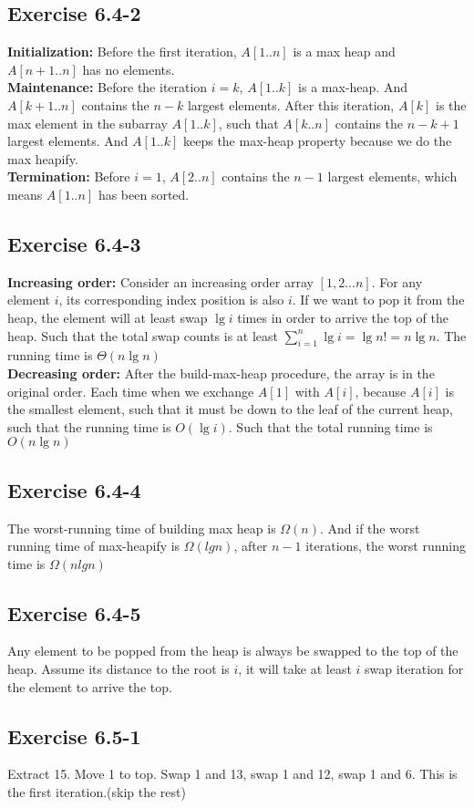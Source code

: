 \documentclass[12pt]{article}
\theoremstyle{definition}
\theoremstyle{remark}
\begin{document}
\subsection*{Exercise 6.4-2}
\textbf{Initialization:} Before the first iteration, $A[1..n]$ is a max heap and $A[n+1..n]$ has no elements.\\
\textbf{Maintenance:} Before the iteration $i=k$, $A[1..k]$ is a max-heap. And $A[k+1..n]$ contains the $n-k$ largest elements. After this iteration, $A[k]$ is the max element in the subarray $A[1..k]$, such that $A[k..n]$ contains the $n-k+1$ largest elements. And $A[1..k]$ keeps the max-heap property because we do the max heapify.\\
\textbf{Termination:} Before $i=1$, $A[2..n]$ contains the $n-1$ largest elements, which means $A[1..n]$ has been sorted.
\subsection*{Exercise 6.4-3}
\textbf{Increasing order:} Consider an increasing order array $[1,2...n]$. For any element $i$, its corresponding index position is also $i$. If we want to pop it from the heap, the element will at least swap $\lg{i}$ times in order to arrive the top of the heap. Such that the total swap counts is at least $\sum_{i=1}^n\lg{i}=\lg{n!}=n\lg{n}$. The running time is $\Theta(n\lg{n})$\\
\textbf{Decreasing order:} After the build-max-heap procedure, the array is in the original order. Each time when we exchange $A[1]$ with $A[i]$, because $A[i]$ is the smallest element, such that it must be down to the leaf of the current heap, such that the running time is $O(\lg{i})$. Such that the total running time is $O(n\lg{n})$
\subsection*{Exercise 6.4-4}
The worst-running time of building max heap is $\Omega(n)$. And if the worst running time of max-heapify is $\Omega(lgn)$, after $n-1$ iterations, the worst running time is $\Omega(nlgn)$
\subsection*{Exercise 6.4-5}
Any element to be popped from the heap is always be swapped to the top of the heap. Assume its distance to the root is $i$, it will take at least $i$ swap iteration for the element to arrive the top.
\subsection*{Exercise 6.5-1}
Extract 15. Move 1 to top. Swap 1 and 13, swap 1 and 12, swap 1 and 6. This is the first iteration.(skip the rest)
\end{document}
